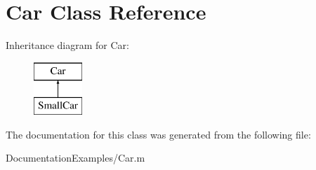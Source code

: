 \hypertarget{class_car}{}\section{Car Class Reference}
\label{class_car}
Inheritance diagram for Car\+:\begin{figure}[H]
\begin{center}
\leavevmode
\includegraphics[height=2.000000cm]{class_car}
\end{center}
\end{figure}


The documentation for this class was generated from the following file\+:\begin{DoxyCompactItemize}
\item 
Documentation\+Examples/Car.\+m\end{DoxyCompactItemize}
